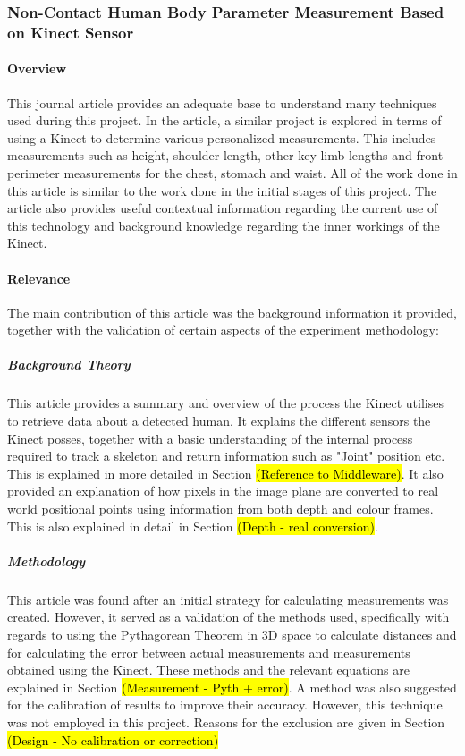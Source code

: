 \subsubsection{Non-Contact Human Body Parameter Measurement Based on Kinect Sensor \cite{nonContact2017}}

\paragraph{Overview}
This journal article provides an adequate base to understand many techniques used during this project. In the article, a similar project is explored in terms of using a Kinect to determine various personalized measurements. This includes measurements such as height, shoulder length, other key limb lengths and front perimeter measurements for the chest, stomach and waist. All of the work done in this article is similar to the work done in the initial stages of this project. The article also provides useful contextual information regarding the current use of this technology and background knowledge regarding the inner workings of the Kinect. 

\paragraph{Relevance}
The main contribution of this article was the background information it provided, together with the validation of certain aspects of the experiment methodology: 

\subparagraph{Background Theory}
This article provides a summary and overview of the process the Kinect utilises to retrieve data about a detected human. It explains the different sensors the Kinect posses, together with a basic understanding of the internal process required to track a skeleton and return information such as "Joint" position etc. This is explained in more detailed in Section \hl{(Reference to Middleware)}. It also provided an explanation of how pixels in the image plane are converted to real world positional points using information from both depth and colour frames. This is also explained in detail in Section \hl{(Depth - real conversion)}.

\subparagraph{Methodology}
This article was found after an initial strategy for calculating measurements was created. However, it served as a validation of the methods used, specifically with regards to using the Pythagorean Theorem in 3D space to calculate distances and for calculating the error between actual measurements and measurements obtained using the Kinect. These methods and the relevant equations are explained in Section \hl{(Measurement - Pyth + error)}. A method was also suggested for the calibration of results to improve their accuracy. However, this technique was not employed in this project. Reasons for the exclusion are given in Section \hl{(Design - No calibration or correction)}

